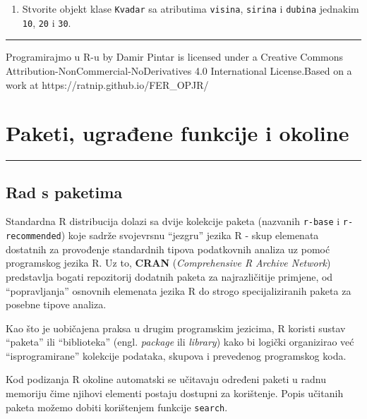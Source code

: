 \documentclass[]{book}
\providecommand{\tightlist}{%
  \setlength{\itemsep}{0pt}\setlength{\parskip}{0pt}}
\theoremstyle{definition}
\theoremstyle{definition}
\theoremstyle{definition}
\theoremstyle{remark}
\begin{document}
\begin{enumerate}
\def\labelenumi{\arabic{enumi}.}
\setcounter{enumi}{2}
\tightlist
\item
  Stvorite objekt klase \texttt{Kvadar} sa atributima \texttt{visina},
  \texttt{sirina} i \texttt{dubina} jednakim \texttt{10}, \texttt{20} i
  \texttt{30}.
\end{enumerate}

\begin{center}\rule{0.5\linewidth}{\linethickness}\end{center}

{Programirajmo u R-u} by Damir Pintar is licensed under a Creative
Commons Attribution-NonCommercial-NoDerivatives 4.0 International
License.Based on a work at https://ratnip.github.io/FER\_OPJR/

\chapter{Paketi, ugrađene funkcije i okoline}\label{paketi}

\begin{center}\rule{0.5\linewidth}{\linethickness}\end{center}

\section{Rad s paketima}\label{rad-s-paketima}

Standardna R distribucija dolazi sa dvije kolekcije paketa (nazvanih
\texttt{r-base} i \texttt{r-recommended}) koje sadrže svojevrsnu
``jezgru'' jezika R - skup elemenata dostatnih za provođenje standardnih
tipova podatkovnih analiza uz pomoć programskog jezika R. Uz to,
\textbf{CRAN} (\emph{Comprehensive R Archive Network}) predstavlja
bogati repozitorij dodatnih paketa za najrazličitije primjene, od
``popravljanja'' osnovnih elemenata jezika R do strogo specijaliziranih
paketa za posebne tipove analiza.

Kao što je uobičajena praksa u drugim programskim jezicima, R koristi
sustav ``paketa'' ili ``biblioteka'' (engl. \emph{package} ili
\emph{library}) kako bi logički organizirao već ``isprogramirane''
kolekcije podataka, skupova i prevedenog programskog koda.

Kod podizanja R okoline automatski se učitavaju određeni paketi u radnu
memoriju čime njihovi elementi postaju dostupni za korištenje. Popis
učitanih paketa možemo dobiti korištenjem funkcije \texttt{search}.
\end{document}
